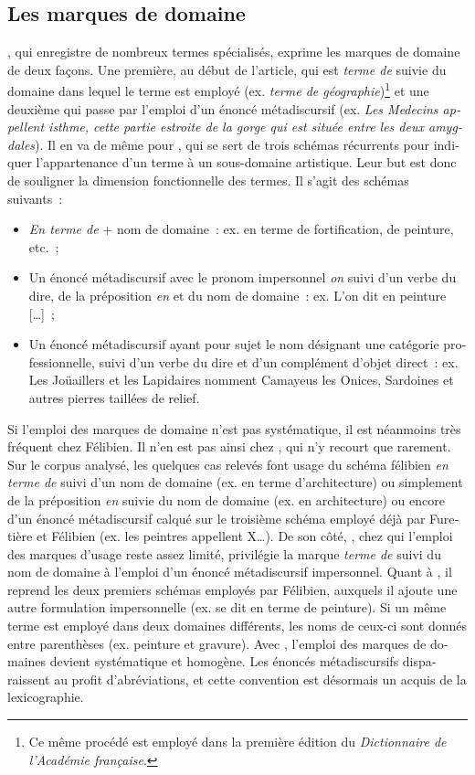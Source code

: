 \documentclass[output=paper,colorlinks,citecolor=brown,arabicfont,chinesefont,booklanguage=french]{langscibook}
\begin{document}
\begin{otherlanguage}{french}
\subsection{Les marques de domaine}
\largerpage
\citet{Furetière1690}, qui enregistre de nombreux termes spécialisés, exprime les marques de domaine de deux façons. Une première, au début de l’article, qui est \emph{terme de} suivie du domaine dans lequel le terme est employé (ex. \emph{terme de géographie})\footnote{Ce même procédé est employé dans la première édition du \emph{Dictionnaire de l’Académie française}.} et une deuxième qui passe par l’emploi d’un énoncé métadiscursif (ex. \emph{Les Medecins appellent isthme, cette partie estroite de la gorge qui est située entre les deux amygdales}). Il en va de même pour \citet{Felibien1676}, qui se sert de trois schémas récurrents pour indiquer l’appartenance d’un terme à un sous-domaine artistique. Leur but est donc de souligner la dimension fonctionnelle des termes. Il s’agit des schémas suivants~:

\begin{itemize}
    \item \emph{En terme de} + nom de domaine~: ex. en terme de fortification, de peinture, etc.~; 
    \item Un énoncé métadiscursif avec le pronom impersonnel \emph{on} suivi d’un verbe du dire, de la préposition \emph{en} et du nom de domaine~: ex. L’on dit en peinture […]~; 
    \item Un énoncé métadiscursif ayant pour sujet le nom désignant une catégorie professionnelle, suivi d’un verbe du dire et d’un complément d’objet direct~: ex. Les Joüaillers et les Lapidaires nomment Camayeus les Onices, Sardoines et autres pierres taillées de relief.
\end{itemize}

Si l’emploi des marques de domaine n’est pas systématique, il est néanmoins très fréquent chez Félibien. Il n’en est pas ainsi chez \citet{Marsy1746}, qui n’y recourt que rarement. Sur le corpus analysé, les quelques cas relevés font usage du schéma félibien \emph{en terme de} suivi d’un nom de domaine (ex. en terme d’architecture) ou simplement de la préposition \emph{en} suivie du nom de domaine (ex. en architecture) ou encore d’un énoncé métadiscursif calqué sur le troisième schéma employé déjà par Furetière et Félibien (ex. les peintres appellent X…). De son côté, \citet{Lacombe1752}, chez qui l’emploi des marques d’usage reste assez limité, privilégie la marque \emph{terme de} suivi du nom de domaine à l’emploi d’un énoncé métadiscursif impersonnel. Quant à  \citet{Pernety1757}, il reprend les deux premiers schémas employés par Félibien, auxquels il ajoute une autre formulation impersonnelle (ex. se dit en terme de peinture). Si un même terme est employé dans deux domaines différents, les noms de ceux-ci sont donnés entre parenthèses (ex. peinture et gravure). Avec \citealt{Boutard1826}, l’emploi des marques de domaines devient systématique et homogène. Les énoncés métadiscursifs disparaissent au profit d’abréviations, et cette convention est désormais un acquis de la lexicographie.


\end{otherlanguage}
\end{document}
